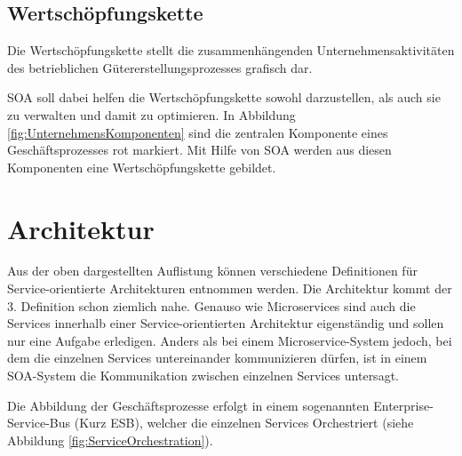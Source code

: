 \subsection{Wertschöpfungskette}
\label{subsec:Wertschoepfungskette}
\frqq Die Wertschöpfungskette stellt die zusammenhängenden Unternehmensaktivitäten des betrieblichen Gütererstellungsprozesses grafisch dar.\flqq \cite{gabler}

SOA soll dabei helfen die Wertschöpfungskette sowohl darzustellen, als auch sie zu verwalten und damit zu optimieren. In Abbildung \ref{fig:UnternehmensKomponenten} sind die zentralen Komponente eines Geschäftsprozesses rot markiert. Mit Hilfe von SOA werden aus diesen Komponenten eine Wertschöpfungskette gebildet.

\section{Architektur}
\label{sec:SoaArchitektur}
Aus der oben dargestellten Auflistung können verschiedene Definitionen für Service-orientierte Architekturen entnommen werden. Die Architektur kommt der 3. Definition schon ziemlich nahe. Genauso wie Microservices sind auch die Services innerhalb einer Service-orientierten Architektur eigenständig und sollen nur eine Aufgabe erledigen. Anders als bei einem Microservice-System jedoch, bei dem die einzelnen Services untereinander kommunizieren dürfen, ist in einem SOA-System die Kommunikation zwischen einzelnen Services untersagt.

Die Abbildung der Geschäftsprozesse erfolgt in einem sogenannten Enterprise-Service-Bus (Kurz ESB), welcher die einzelnen Services Orchestriert (siehe Abbildung \ref{fig:ServiceOrchestration}).

